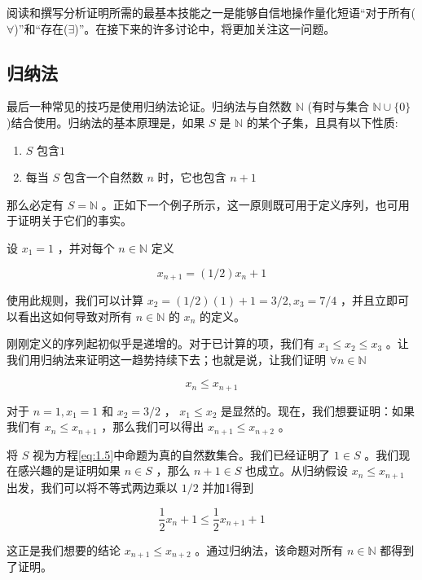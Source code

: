 阅读和撰写分析证明所需的最基本技能之一是能够自信地操作量化短语“对于所有($\forall$)”和“存在($\exists$)”。在接下来的许多讨论中，将更加关注这一问题。

\subsection{归纳法}

最后一种常见的技巧是使用归纳法论证。归纳法与自然数 \(\mathbb{N}\) (有时与集合 \(\mathbb{N} \cup  \{ 0\}\) )结合使用。归纳法的基本原理是，如果 \(S\) 是 \(\mathbb{N}\) 的某个子集，且具有以下性质:

\begin{enumerate}[label = (\roman*)]
\item \(S\) 包含$1$
\item 每当 \(S\) 包含一个自然数 \(n\) 时，它也包含 \(n + 1\) 
\end{enumerate}

那么必定有 \(S = \mathbb{N}\) 。正如下一个例子所示，这一原则既可用于定义序列，也可用于证明关于它们的事实。

\begin{Eg}
  \label{eg:1.2.7}
设 \({x}_{1} = 1\) ，并对每个 \(n \in  \mathbb{N}\) 定义

\[
{x}_{n + 1} = \left( {1/2}\right) {x}_{n} + 1
\]

使用此规则，我们可以计算 \({x}_{2} = \left( {1/2}\right) \left( 1\right)  + 1 = 3/2,{x}_{3} = 7/4\) ，并且立即可以看出这如何导致对所有 \(n \in  \mathbb{N}\) 的 \({x}_{n}\) 的定义。

刚刚定义的序列起初似乎是递增的。对于已计算的项，我们有 \({x}_{1} \leq  {x}_{2} \leq  {x}_{3}\) 。让我们用归纳法来证明这一趋势持续下去；也就是说，让我们证明 $\forall n\in \mathbb{N}$

\begin{equation}
\label{eq:1.5}
{x}_{n} \leq  {x}_{n + 1}
\end{equation}

对于 \(n = 1,{x}_{1} = 1\) 和 \({x}_{2} = 3/2\) ， \({x}_{1} \leq  {x}_{2}\) 是显然的。现在，我们想要证明：如果我们有 \({x}_{n} \leq  {x}_{n + 1}\) ，那么我们可以得出 \({x}_{n + 1} \leq  {x}_{n + 2}\) 。

将 \(S\) 视为方程\eqref{eq:1.5}中命题为真的自然数集合。我们已经证明了 \(1 \in  S\) 。我们现在感兴趣的是证明如果 \(n \in  S\) ，那么 \(n + 1 \in  S\) 也成立。从归纳假设 \({x}_{n} \leq  {x}_{n + 1}\) 出发，我们可以将不等式两边乘以 \(1/2\) 并加1得到

\[
\frac{1}{2}{x}_{n} + 1 \leq  \frac{1}{2}{x}_{n + 1} + 1
\]

这正是我们想要的结论 \({x}_{n + 1} \leq  {x}_{n + 2}\) 。通过归纳法，该命题对所有 \(n \in  \mathbb{N}\) 都得到了证明。
  
\end{Eg}


